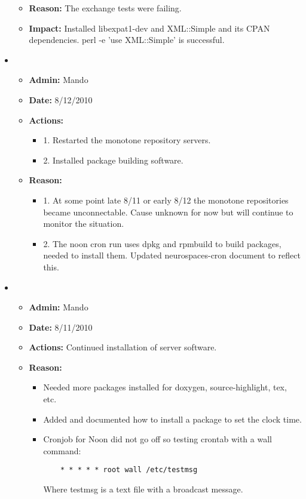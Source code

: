 \documentclass[12pt]{article}
\begin{document}
\begin{itemize}
\begin{itemize}
\item[] {\bf Reason:} The exchange tests were failing.
\item[] {\bf Impact:} Installed libexpat1-dev and XML::Simple and its
  CPAN dependencies.  perl -e 'use XML::Simple' is successful.
\end{itemize}

\item 
\begin{itemize}
\item[] {\bf Admin:} Mando
\item[] {\bf Date:} 8/12/2010 
\item[] {\bf Actions:} 
\begin{itemize}
	\item[] 1. Restarted the monotone repository servers.
	\item[] 2. Installed package building software.
\end{itemize}
\item[] {\bf Reason:} 
\begin{itemize}
	\item[] 1. At some point late 8/11 or early 8/12 the monotone repositories became unconnectable. Cause unknown for now but will continue to monitor the situation.
	\item[] 2. The noon cron run uses dpkg and rpmbuild to build packages, needed to install them. Updated neurospaces-cron document to reflect this.
\end{itemize}
\end{itemize}

\item 
\begin{itemize}
\item[] {\bf Admin:} Mando
\item[] {\bf Date:} 8/11/2010 
\item[] {\bf Actions:} Continued installation of server software.
\item[] {\bf Reason:} 
\begin{itemize}
\item[] Needed more packages installed for doxygen, source-highlight, tex, etc. 
\item[] Added and documented how to install a package to set the clock time.
\item[] Cronjob for Noon did not go off so testing crontab with a wall command:
\begin{verbatim}
	* * * * * root wall /etc/testmsg
\end{verbatim}
Where testmsg is a text file with a broadcast message.
\end{itemize}
	

\end{itemize}
\end{itemize}
\end{document}
